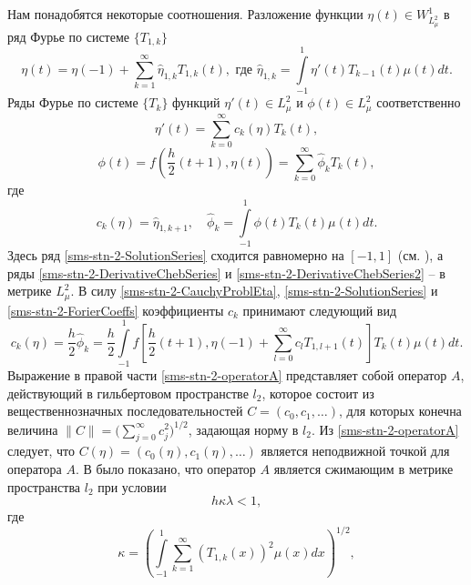 Нам понадобятся некоторые соотношения. Разложение функции $\eta(t)\in W_{L_\mu^2}^1$ в ряд Фурье по системе $\{T_{1,k}\}$
\begin{equation}\label{sms-stn-2-SolutionSeries}
\eta(t)=\eta(-1)+\sum\limits_{k=1}^{\infty}\hat\eta_{1,k} T_{1,k}(t),\text{ где } \hat\eta_{1,k}=\int\limits_{-1}^1\eta'(t)T_{k-1}(t)\mu(t)dt.
\end{equation}
Ряды Фурье по системе $\{T_k\}$ функций $\eta'(t)\in L^2_\mu$ и $\phi(t)\in L^2_\mu$ соответственно
\begin{equation}\label{sms-stn-2-DerivativeChebSeries}
\eta'(t)=\sum\limits_{k=0}^{\infty}c_k(\eta) T_k(t),
\end{equation}
\begin{equation}\label{sms-stn-2-DerivativeChebSeries2}
\phi(t)=f\left(\frac h2(t+1),\eta(t)\right)=\sum\limits_{k=0}^{\infty}\hat\phi_k T_k(t),
\end{equation}
где
\begin{equation}\label{sms-stn-2-ForierCoeffs}
c_k(\eta)=\hat\eta_{1,k+1},\quad\hat\phi_k=\int\limits_{-1}^1\phi(t)T_k(t)\mu(t)dt.
\end{equation}
Здесь ряд \eqref{sms-stn-2-SolutionSeries} сходится равномерно на $[-1,1]$ (см. \cite{sms-stn-2-SharIzVuz}), а ряды \eqref{sms-stn-2-DerivativeChebSeries} и \eqref{sms-stn-2-DerivativeChebSeries2} -- в метрике $L^2_\mu$. В силу \eqref{sms-stn-2-CauchyProblEta}, \eqref{sms-stn-2-SolutionSeries} и \eqref{sms-stn-2-ForierCoeffs} коэффициенты $c_k$ принимают следующий вид
\begin{equation}\label{sms-stn-2-operatorA}
c_k(\eta)=\frac h2\hat\phi_k=\frac h2\int\limits_{-1}^1f\left[\frac h2(t+1),\eta(-1)+\sum\limits_{l=0}^{\infty}c_l T_{1,l+1}(t)\right]T_k(t)\mu(t)dt.
\end{equation}
Выражение в правой части \eqref{sms-stn-2-operatorA} представляет собой оператор $A$, действующий в гильбертовом пространстве $l_2$, которое состоит из вещественнозначных последовательностей $C=(c_0,c_1,\ldots)$, для которых конечна величина $\|C\|=\bigl(\sum_{j=0}^\infty c_j^2)^{1/2}$, задающая норму в $l_2$. Из \eqref{sms-stn-2-operatorA} следует, что $C(\eta) = (c_0(\eta),c_1(\eta),\dots)$ является неподвижной точкой для оператора $A$. В \cite{sms-stn-2-PolOrtPorSobChebUrav} было показано, что оператор $A$ является сжимающим в метрике пространства $l_2$ при условии
\begin{equation}\label{sms-stn-2-ContractionCond}
h\kappa\lambda<1,
\end{equation}
где
\begin{equation*}
\kappa=\left(\int\limits_{-1}^1\sum_{k=1}^{\infty}(T_{1,k}(x))^2\mu(x)dx\right)^{1/2},
\end{equation*}
